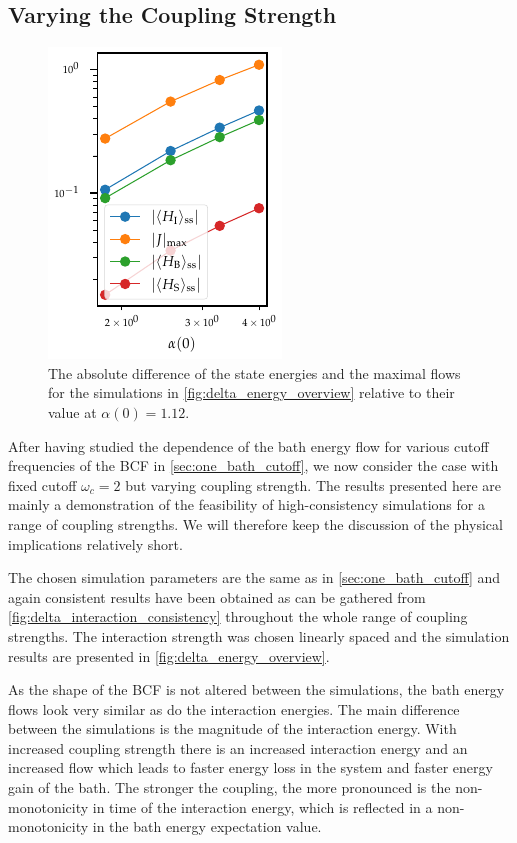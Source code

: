 \subsection{Varying the Coupling Strength}
\label{sec:one_bathcoup_strength}
\begin{figure}
  \centering
  \includegraphics{figs/one_bath_syst/final_states_flows}
  \caption{\label{fig:delta_fs_flow} The absolute difference of the state energies and the
  maximal flows for the simulations in
  \cref{fig:delta_energy_overview} relative to their value at \(α(0)=1.12\).}
\end{figure}
After having studied the dependence of the bath energy flow for
various cutoff frequencies of the BCF in \cref{sec:one_bath_cutoff},
we now consider the case with fixed cutoff \(ω_c=2\) but varying
coupling strength. The results presented here are mainly a
demonstration of the feasibility of high-consistency simulations for a
range of coupling strengths. We will therefore keep the discussion of
the physical implications relatively short.

The chosen simulation parameters are the same as in
\cref{sec:one_bath_cutoff} and again consistent results have been
obtained as can be gathered from
\cref{fig:delta_interaction_consistency} throughout the whole range of
coupling strengths.
The interaction strength was chosen linearly spaced and the simulation
results are presented in \cref{fig:delta_energy_overview}.

As the shape of the BCF is not altered between the simulations, the
bath energy flows look very similar as do the interaction
energies. The main difference between the simulations is the magnitude
of the interaction energy. With increased coupling strength there is
an increased interaction energy and an increased flow which leads to
faster energy loss in the system and faster energy gain of the
bath. The stronger the coupling, the more pronounced is the
non-monotonicity in time of the interaction energy, which is reflected
in a non-monotonicity in the bath energy expectation value.

